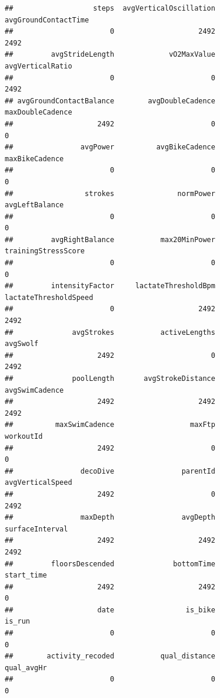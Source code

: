 \documentclass[
]{book}
\newenvironment{Shaded}{\begin{snugshade}}{\end{snugshade}}
\newcommand{\CommentTok}[1]{\textcolor[rgb]{0.56,0.35,0.01}{\textit{#1}}}
\begin{document}
\begin{verbatim}
##                   steps  avgVerticalOscillation    avgGroundContactTime 
##                       0                    2492                    2492 
##         avgStrideLength             vO2MaxValue        avgVerticalRatio 
##                       0                       0                    2492 
## avgGroundContactBalance        avgDoubleCadence        maxDoubleCadence 
##                    2492                       0                       0 
##                avgPower          avgBikeCadence          maxBikeCadence 
##                       0                       0                       0 
##                 strokes               normPower          avgLeftBalance 
##                       0                       0                       0 
##         avgRightBalance           max20MinPower     trainingStressScore 
##                       0                       0                       0 
##         intensityFactor     lactateThresholdBpm   lactateThresholdSpeed 
##                       0                    2492                    2492 
##              avgStrokes           activeLengths                avgSwolf 
##                    2492                       0                    2492 
##              poolLength       avgStrokeDistance          avgSwimCadence 
##                    2492                    2492                    2492 
##          maxSwimCadence                  maxFtp               workoutId 
##                    2492                       0                       0 
##                decoDive                parentId        avgVerticalSpeed 
##                    2492                       0                    2492 
##                maxDepth                avgDepth         surfaceInterval 
##                    2492                    2492                    2492 
##         floorsDescended              bottomTime              start_time 
##                    2492                    2492                       0 
##                    date                 is_bike                  is_run 
##                       0                       0                       0 
##        activity_recoded           qual_distance              qual_avgHr 
##                       0                       0                       0
\end{verbatim}

\begin{Shaded}
\end{Shaded}
\end{document}
